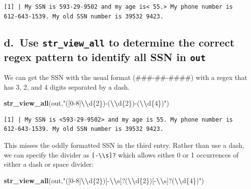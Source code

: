 \documentclass[
]{book}
\newenvironment{Shaded}{\begin{snugshade}}{\end{snugshade}}
\newcommand{\FunctionTok}[1]{\textcolor[rgb]{0.13,0.29,0.53}{\textbf{#1}}}
\newcommand{\NormalTok}[1]{#1}
\newcommand{\SpecialCharTok}[1]{\textcolor[rgb]{0.81,0.36,0.00}{\textbf{#1}}}
\newcommand{\StringTok}[1]{\textcolor[rgb]{0.31,0.60,0.02}{#1}}
\begin{document}
\begin{verbatim}
[1] | My SSN is 593-29-9502 and my age is< 55.> My phone number is 612-643-1539. My old SSN number is 39532 9423.
\end{verbatim}

\hypertarget{d.-use-str_view_all-to-determine-the-correct-regex-pattern-to-identify-all-ssn-in-out}{%
\subsection{\texorpdfstring{d.~Use \texttt{str\_view\_all} to determine the correct regex pattern to identify all SSN in \texttt{out}}{d.~Use str\_view\_all to determine the correct regex pattern to identify all SSN in out}}\label{d.-use-str_view_all-to-determine-the-correct-regex-pattern-to-identify-all-ssn-in-out}}

We can get the SSN with the usual format (\#\#\#-\#\#-\#\#\#\#) with a regex that has 3, 2, and 4 digits separated by a dash.

\begin{Shaded}
\begin{Highlighting}[]
\FunctionTok{str\_view\_all}\NormalTok{(out,}\StringTok{"([0{-}8]}\SpecialCharTok{\textbackslash{}\textbackslash{}}\StringTok{d\{2\}){-}(}\SpecialCharTok{\textbackslash{}\textbackslash{}}\StringTok{d\{2\}){-}(}\SpecialCharTok{\textbackslash{}\textbackslash{}}\StringTok{d\{4\})"}\NormalTok{)}
\end{Highlighting}
\end{Shaded}

\begin{verbatim}
[1] | My SSN is <593-29-9502> and my age is 55. My phone number is 612-643-1539. My old SSN number is 39532 9423.
\end{verbatim}

This misses the oddly formatted SSN in the third entry. Rather than use a dash, we can specify the divider as \texttt{{[}-\textbackslash{}\textbackslash{}s{]}?} which allows either 0 or 1 occurrences of either a dash or space divider:

\begin{Shaded}
\begin{Highlighting}[]
\FunctionTok{str\_view\_all}\NormalTok{(out,}\StringTok{"([0{-}8]}\SpecialCharTok{\textbackslash{}\textbackslash{}}\StringTok{d\{2\})[{-}}\SpecialCharTok{\textbackslash{}\textbackslash{}}\StringTok{s]?(}\SpecialCharTok{\textbackslash{}\textbackslash{}}\StringTok{d\{2\})[{-}}\SpecialCharTok{\textbackslash{}\textbackslash{}}\StringTok{s]?(}\SpecialCharTok{\textbackslash{}\textbackslash{}}\StringTok{d\{4\})"}\NormalTok{)}
\end{Highlighting}
\end{Shaded}
\end{document}
